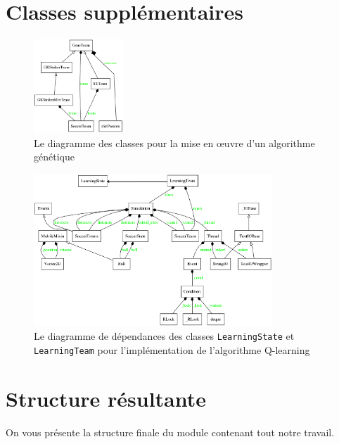 \documentclass[12pt,a4paper]{article}
\begin{document}
\section*{Classes suppl\'ementaires}
\begin{figure}[!h]
  \centering
  \captionsetup{justification=centering}
  \includegraphics[width=0.3\textwidth]{genetic_mod}
  \caption[Les classes pour l'algorithme g\'en\'etique]{Le diagramme des 
classes pour la mise en \oe uvre d'un algorithme g\'en\'etique}
  \label{fig:gene}
\end{figure}

\begin{figure}[!h]
  \centering
  \captionsetup{justification=centering}
  \includegraphics[width=0.8\textwidth]{machineLearning_mod}
  \caption[Les classes pour l'apprentissage automatique]{Le diagramme de 
d\'ependances des classes \texttt{LearningState} et \texttt{LearningTeam} pour 
l'impl\'ementation de l'algorithme Q-learning}
  \label{fig:ml}
\end{figure}

\section*{Structure r\'esultante}
On vous pr\'esente la structure finale du module contenant tout notre travail.
\end{document}
